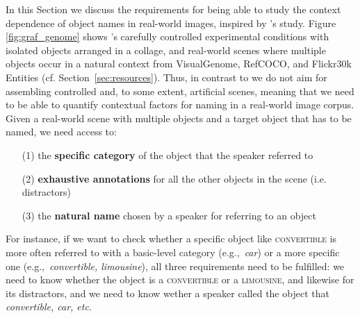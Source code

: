 \documentclass[runningheads]{llncs}
\newcommand{\vgenome}{VisualGenome\xspace}
\newcommand{\refcoco}{RefCOCO\xspace}
\newcommand{\flickr}{Flickr30k Entities\xspace}
\newcommand{\refexp}[1]{\textsl{#1}}
\newcommand{\cat}[1]{\textsc{#1}}
\begin{document}
In this Section we discuss the requirements for  being able to study the context dependence of object names in real-world images, inspired by \cite{graf2016animal}'s study.
 Figure \ref{fig:graf_genome} shows  \cite{graf2016animal}'s carefully controlled experimental conditions with isolated objects arranged in a collage, and real-world scenes where multiple objects occur in a natural context from \vgenome\cite{krishna2016visualgenome}, \refcoco\cite{Kazemzadeh2014}, and \flickr\cite{plummer2015flickr30kentities} (cf. Section~\ref{sec:resources}).
Thus, in contrast to \cite{graf2016animal} we do not aim for assembling controlled and, to some extent, artificial scenes, meaning that we need to be able to quantify contextual factors for naming in a real-world image corpus. 
Given a real-world scene with multiple objects and a target object that has to be named, we need access to:

\begin{itemize}   
		\item[(1)] the \textbf{specific category} of the object that the speaker referred to 
		\item[(2)] \textbf{exhaustive annotations} for all the other objects in the scene (i.e. distractors)
		\item[(3)] the \textbf{natural name} chosen by a speaker for referring to an object

\end{itemize}

For instance, if we want to check whether a specific object like \cat{convertible} is more often referred to with a basic-level category (e.g.,~\refexp{car}) or a more specific one (e.g.,~\refexp{convertible, limousine}), all three requirements need to be fulfilled: we need to know whether the object is a \cat{convertible} or a \cat{limousine}, and likewise for its distractors, and we need to know wether a speaker called the object that \refexp{convertible, car, etc}.
\end{document}
